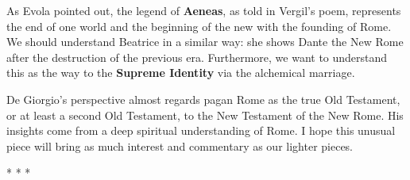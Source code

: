 As Evola pointed out, the legend of \textbf{Aeneas}, as told in Vergil's poem, represents the end of one world and the beginning of the new with the founding of Rome. We should understand Beatrice in a similar way: she shows Dante the New Rome after the destruction of the previous era. Furthermore, we want to understand this as the way to the \textbf{Supreme Identity} via the alchemical marriage.

De Giorgio's perspective almost regards pagan Rome as the true Old Testament, or at least a second Old Testament, to the New Testament of the New Rome. His insights come from a deep spiritual understanding of Rome. I hope this unusual piece will bring as much interest and commentary as our lighter pieces.



\begin{center}* * *\end{center}


